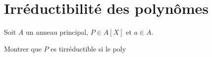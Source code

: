 \documentclass[french]{report}
\begin{document}
\section*{Irréductibilité des polynômes}

\begin{exo}
    Soit \(A\) un anneau principal, \(P\in A[X]\) et \(a\in A\).
    \begin{q}{1}
        Montrer que \(P\) es tirréductible si le poly
    \end{q}
\end{exo}
\end{document}
